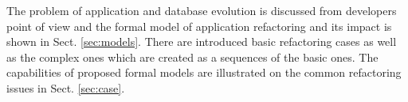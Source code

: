 \documentclass[runningheads]{comsis}
\begin{document}
The problem of application and database evolution is discussed from developers point of view and the formal model of application refactoring and its impact is shown in Sect. \ref{sec:models}. There are introduced basic refactoring cases as well as the complex ones which are created as a sequences of the basic ones. The capabilities of proposed formal models are illustrated on the common refactoring issues in Sect. \ref{sec:case}.


\end{document}
